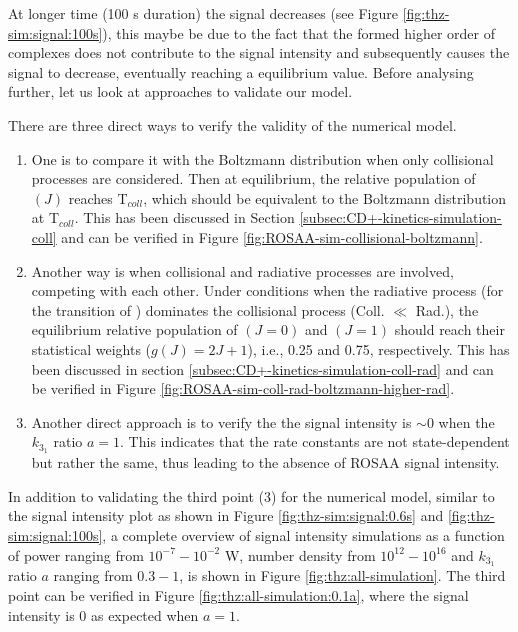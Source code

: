 At longer time (100 s duration) the signal decreases (see Figure \ref{fig:thz-sim:signal:100s}),
this maybe be due to the fact that the formed higher order of complexes 
does not contribute to the signal intensity and subsequently causes the signal to decrease, 
eventually reaching a equilibrium value. 
Before analysing further, let us look at approaches to validate our model.


There are three direct ways to verify the validity of the numerical model.

\begin{enumerate}
    \item  One is to compare it with the Boltzmann distribution when only collisional
          processes are considered. Then at equilibrium, the relative population of
          \CD$(J)$ reaches T$_{coll}$, which should be equivalent to the
          Boltzmann distribution at T$_{coll}$. This has been discussed in Section
          \ref{subsec:CD+-kinetics-simulation-coll} and can be verified in Figure
          \ref{fig:ROSAA-sim-collisional-boltzmann}.
    \item Another way is when collisional and radiative processes are involved,
          competing with each other. Under conditions when the radiative process (for
          the \CDline transition of \CD) dominates the collisional process (Coll. $\ll$
          Rad.), the equilibrium relative population of \CD$(J=0)$ and \CD$(J=1)$ should
          reach their statistical weights ($g(J) = 2J+1$), i.e., 0.25 and 0.75,
          respectively. This has been discussed in section
          \ref{subsec:CD+-kinetics-simulation-coll-rad} and can be verified in Figure
          \ref{fig:ROSAA-sim-coll-rad-boltzmann-higher-rad}.
    \item Another direct approach is to verify the the signal intensity is $\sim 0$ when
          the $k_{3_1}$ ratio $a=1$. This indicates that the rate constants are not
          state-dependent but rather the same, thus leading to the absence of ROSAA
          signal intensity.
\end{enumerate}

In addition to validating the third point (3) for the numerical model, similar
to the signal intensity plot as shown in Figure \ref{fig:thz-sim:signal:0.6s}
and \ref{fig:thz-sim:signal:100s}, a complete overview of signal intensity
simulations as a function of power ranging from $10^{-7}-10^{-2}$ W, number
density from $10^{12}-10^{16}$ \percc and $k_{3_1}$ ratio $a$ ranging from
$0.3-1$, is shown in Figure \ref{fig:thz:all-simulation}. The third point can
be verified in Figure \ref{fig:thz:all-simulation:0.1a}, where the
signal intensity is 0 as expected when $a=1$.\\

